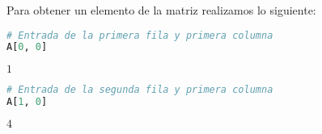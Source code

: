\documentclass[a4,11pt]{aleph-notas}
\begin{document}
Para obtener un elemento de la matriz realizamos lo siguiente:
\begin{pycodigo}
    \begin{ipynbcodigo}\begin{lstlisting}[language=Python]
# Entrada de la primera fila y primera columna
A[0, 0]
    \end{lstlisting}\end{ipynbcodigo}
    \begin{ipynbsalida}
        $1$
    \end{ipynbsalida}
    \begin{ipynbcodigo}\begin{lstlisting}[language=Python]
# Entrada de la segunda fila y primera columna
A[1, 0]
    \end{lstlisting}\end{ipynbcodigo}
    \begin{ipynbsalida}
        $4$
    \end{ipynbsalida}
\end{pycodigo}
\end{document}
